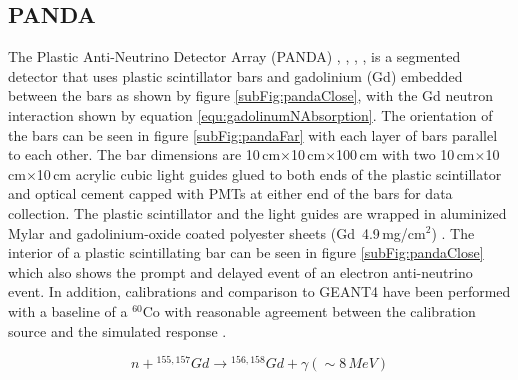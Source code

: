\subsection{PANDA}
The Plastic Anti-Neutrino Detector Array (PANDA) \cite{PANDA_2012}, \cite{PANDA_2014}, \cite{PANDA_tgf}, \cite{IIRIE_Panda_2021}, is a segmented detector that uses plastic scintillator bars and gadolinium (Gd) embedded between the bars as shown by figure \ref{subFig:pandaClose}, with the Gd neutron interaction shown by equation \ref{equ:gadolinumNAbsorption}. The orientation of the bars can be seen in figure \ref{subFig:pandaFar} with each layer of bars parallel to each other. The bar dimensions are 10\,cm$\times$10\,cm$\times$100\,cm with two 10\,cm$\times$10\,cm$\times$10\,cm acrylic cubic light guides glued to both ends of the plastic scintillator and optical cement capped with PMTs at either end of the bars for data collection. The plastic scintillator and the light guides are wrapped in aluminized Mylar and gadolinium-oxide coated polyester sheets (Gd~4.9\,mg/cm$^2$) \cite{PANDA_2014}. The interior of a plastic scintillating bar can be seen in figure \ref{subFig:pandaClose} which also shows the prompt and delayed event of an electron anti-neutrino event. In addition, calibrations and comparison to GEANT4 \cite{Agostinelli:2002hh} have been performed with a baseline of a $^{60}$Co with reasonable agreement between the calibration source and the simulated response \cite{PANDA_2012}. 

\begin{equation}
n + {^{155,157}Gd} \rightarrow {^{156,158} Gd} + \gamma (\sim 8\,MeV)
\label{equ:gadolinumNAbsorption}
\end{equation}

